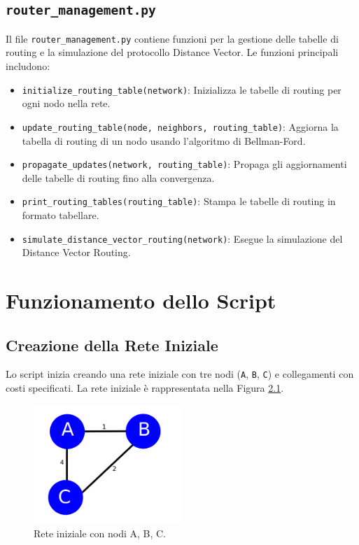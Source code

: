 \documentclass{report}
\begin{document}
\section{\texttt{router\_management.py}}
Il file \texttt{router\_management.py} contiene funzioni per la gestione delle tabelle di routing e la simulazione del protocollo Distance Vector. Le funzioni principali includono:
\begin{itemize}
    \item \texttt{initialize\_routing\_table(network)}: Inizializza le tabelle di routing per ogni nodo nella rete.
    \item \texttt{update\_routing\_table(node, neighbors, routing\_table)}: Aggiorna la tabella di routing di un nodo usando l'algoritmo di Bellman-Ford.
    \item \texttt{propagate\_updates(network, routing\_table)}: Propaga gli aggiornamenti delle tabelle di routing fino alla convergenza.
    \item \texttt{print\_routing\_tables(routing\_table)}: Stampa le tabelle di routing in formato tabellare.
    \item \texttt{simulate\_distance\_vector\_routing(network)}: Esegue la simulazione del Distance Vector Routing.
\end{itemize}

\chapter{Funzionamento dello Script}

\section{Creazione della Rete Iniziale}
Lo script inizia creando una rete iniziale con tre nodi (\texttt{A}, \texttt{B}, \texttt{C}) e collegamenti con costi specificati. La rete iniziale è rappresentata nella Figura \ref{fig:initial_network}.

\begin{figure}[H]
    \centering
    \includegraphics[width=0.5\textwidth]{img/img1.png}
    \caption{Rete iniziale con nodi A, B, C.}
    \label{fig:initial_network}
\end{figure}
\end{document}
